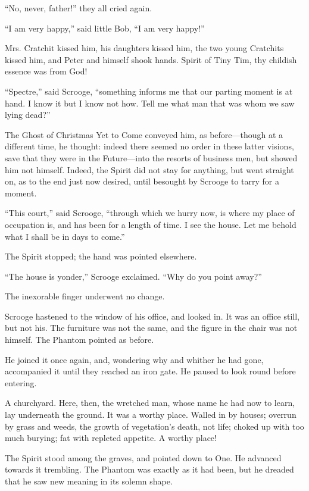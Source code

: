 \documentclass[paper=5.5in:8.5in,BCOR=15mm,twoside,DIV=15,headinclude=off,12pt,chapterprefix=off,openany,headings=huge]{scrbook} %
\begin{document}
\enquote{No, never, father!} they all cried again.

\enquote{I am very happy,} said little Bob, \enquote{I am very happy!}

Mrs. Cratchit kissed him, his daughters kissed him, the two young Cratchits kissed him, and Peter and himself shook hands. Spirit of Tiny Tim, thy childish essence was from God!

\enquote{Spectre,} said Scrooge, \enquote{something informs me that our parting moment is at hand. I know it but I know not how. Tell me what man that was whom we saw lying dead?}

The Ghost of Christmas Yet to Come conveyed him, as before—though at a different time, he thought: indeed there seemed no order in these latter visions, save that they were in the Future—into the resorts of business men, but showed him not himself. Indeed, the Spirit did not stay for anything, but went straight on, as to the end just now desired, until besought by Scrooge to tarry for a moment.

\enquote{This court,} said Scrooge, \enquote{through which we hurry now, is where my place of occupation is, and has been for a length of time. I see the house. Let me behold what I shall be in days to come.}

The Spirit stopped; the hand was pointed elsewhere.

\enquote{The house is yonder,} Scrooge exclaimed. \enquote{Why do you point away?}

The inexorable finger underwent no change.

Scrooge hastened to the window of his office, and looked in. It was an office still, but not his. The furniture was not the same, and the figure in the chair was not himself. The Phantom pointed as before.

He joined it once again, and, wondering why and whither he had gone, accompanied it until they reached an iron gate. He paused to look round before entering.

A churchyard. Here, then, the wretched man, whose name he had now to learn, lay underneath the ground. It was a worthy place. Walled in by houses; overrun by grass and weeds, the growth of vegetation's death, not life; choked up with too much burying; fat with repleted appetite. A worthy place!

The Spirit stood among the graves, and pointed down to One. He advanced towards it trembling. The Phantom was exactly as it had been, but he dreaded that he saw new meaning in its solemn shape.
\end{document}
